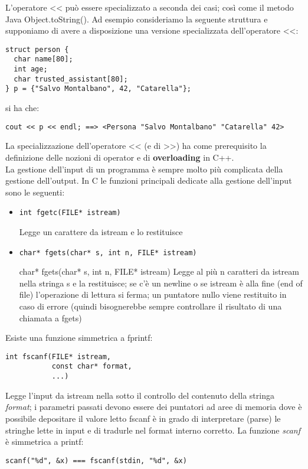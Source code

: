\documentclass[a4paper,12pt, oneside]{book}
\begin{document}
L'operatore << può essere specializzato a seconda dei casi;
così come il metodo Java Object.toString(). Ad esempio consideriamo la seguente struttura e supponiamo
di avere a disposizione una versione specializzata
dell'operatore <<:
\begin{verbatim}
struct person {
  char name[80];
  int age;
  char trusted_assistant[80];
} p = {"Salvo Montalbano", 42, "Catarella"};
\end{verbatim}
si ha che:
\begin{verbatim}
cout << p << endl; ==> <Persona "Salvo Montalbano" "Catarella" 42>
\end{verbatim}
La specializzazione dell'operatore << (e di >>) ha come
prerequisito la definizione delle nozioni di operator e di
\textbf{overloading }in C++.\\
La gestione dell'input di un programma è sempre molto più
complicata della gestione dell'output. In C le funzioni principali dedicate alla gestione dell'input sono
le seguenti:
\begin{itemize}
\item
\begin{verbatim}
int fgetc(FILE* istream)
\end{verbatim}
Legge un carattere da istream e lo restituisce
\item 
\begin{verbatim}
char* fgets(char* s, int n, FILE* istream)
\end{verbatim}
char* fgets(char* s, int n, FILE* istream)
Legge al più n caratteri da istream nella stringa s e la restituisce;
se c'è un newline o se istream è alla fine (end of file) l'operazione di lettura si ferma; un puntatore nullo viene restituito in caso di errore (quindi bisognerebbe sempre controllare il risultato di una chiamata a
fgets)
\end{itemize}
Esiste una funzione simmetrica a fprintf:
\begin{verbatim}
int fscanf(FILE* istream,
           const char* format,
           ...)
\end{verbatim}
Legge l'input da istream nella sotto il controllo del contenuto della stringa \textit{format}; i parametri passati devono essere dei puntatori ad
aree di memoria dove è possibile depositare il valore letto
fscanf è in grado di interpretare (parse) le stringhe lette in input e di tradurle nel format interno corretto. La funzione \textit{scanf} è simmetrica a printf:
\begin{verbatim}
scanf("%d", &x) === fscanf(stdin, "%d", &x)
\end{verbatim}
\end{document}
